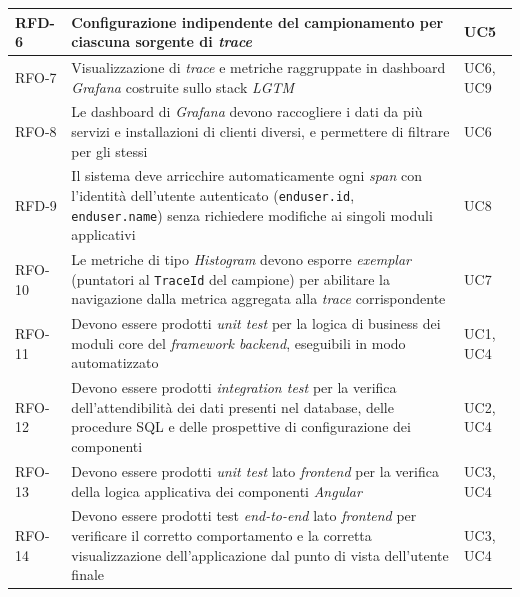 \begin{longtable}{|C{2cm}|C{8.5cm}|C{2.5cm}|}
      \hline
      RFD-6              & Configurazione indipendente del campionamento per ciascuna sorgente di \emph{trace}                                                                                                                      & UC5                     \\
      \hline
      RFO-7              & Visualizzazione di \emph{trace} e metriche raggruppate in dashboard \emph{Grafana} costruite sullo stack \emph{LGTM}                                                                                     & UC6, UC9                \\
      \hline
      RFO-8              & Le dashboard di \emph{Grafana} devono raccogliere i dati da più servizi e installazioni di clienti diversi, e permettere di filtrare per gli stessi                                                      & UC6                     \\
      \hline
      RFD-9              & Il sistema deve arricchire automaticamente ogni \emph{span} con l'identità dell'utente autenticato (\texttt{enduser.id}, \texttt{enduser.name}) senza richiedere modifiche ai singoli moduli applicativi & UC8                     \\
      \hline
      RFO-10             & Le metriche di tipo \emph{Histogram} devono esporre \emph{exemplar} (puntatori al \texttt{TraceId} del campione) per abilitare la navigazione dalla metrica aggregata alla \emph{trace} corrispondente   & UC7                     \\
      \hline
      RFO-11             & Devono essere prodotti \emph{unit test} per la logica di business dei moduli core del \emph{framework backend}, eseguibili in modo automatizzato                                                         & UC1, UC4                \\
      \hline
      RFO-12             & Devono essere prodotti \emph{integration test} per la verifica dell'attendibilità dei dati presenti nel database, delle procedure SQL e delle prospettive di configurazione dei componenti               & UC2, UC4                \\
      \hline
      RFO-13             & Devono essere prodotti \emph{unit test} lato \emph{frontend} per la verifica della logica applicativa dei componenti \emph{Angular}                                                                      & UC3, UC4                \\
      \hline
      RFO-14             & Devono essere prodotti test \emph{end-to-end} lato \emph{frontend} per verificare il corretto comportamento e la corretta visualizzazione dell'applicazione dal punto di vista dell'utente finale        & UC3, UC4                \\

\end{longtable}
